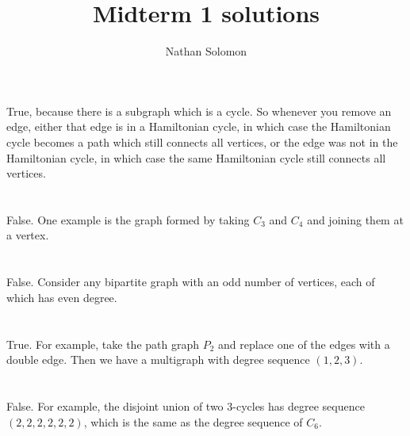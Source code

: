 \documentclass[12pt]{article}
\begin{document}
\title{Midterm 1 solutions}
\author{Nathan Solomon}
\maketitle

\section{}
\noindent{}\bigskip\par
True, because there is a subgraph which is a cycle. So whenever you remove an edge, either that edge is in a Hamiltonian cycle, in which case the Hamiltonian cycle becomes a path which still connects all vertices, or the edge was not in the Hamiltonian cycle, in which case the same Hamiltonian cycle still connects all vertices.

\section{}
\noindent{}\bigskip\par
False. One example is the graph formed by taking $C_3$ and $C_4$ and joining them at a vertex.

\section{}
\noindent{}\bigskip\par
False. Consider any bipartite graph with an odd number of vertices, each of which has even degree.

\section{}
\noindent{}\bigskip\par
True. For example, take the path graph $P_2$ and replace one of the edges with a double edge. Then we have a multigraph with degree sequence $(1,2,3)$.

\section{}
\noindent{}\bigskip\par
False. For example, the disjoint union of two 3-cycles has degree sequence $(2,2,2,2,2,2)$, which is the same as the degree sequence of $C_6$.
\end{document}
